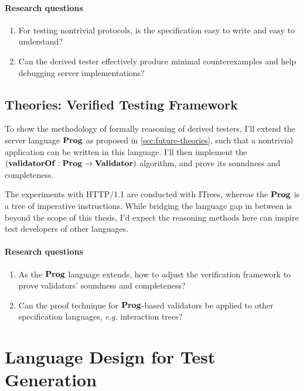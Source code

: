 \documentclass{article}
\newcommand{\http}{HTTP/1.1\xspace}
\theoremstyle{definition}
\newcommand{\Validator}{\ottkw{Validator}}
\newcommand{\Prog}{\ottkw{Prog}}
\newcommand{\validatorOf}{\ottkw{validatorOf}}
\begin{document}
\paragraph{Research questions}
\begin{enumerate}
\item For testing nontrivial protocols, is the specification easy to write and
  easy to understand?
\item Can the derived tester effectively produce minimal counterexamples and
  help debugging server implementations?
\end{enumerate}

\subsection{Theories: Verified Testing Framework}
To show the methodology of formally reasoning of derived testers, I'll extend
the server language $\Prog$ as proposed in \autoref{sec:future-theories}, such
that a nontrivial application can be written in this language.  I'll then
implement the $(\validatorOf:\Prog\to\Validator)$ algorithm, and prove its
soundness and completeness.

The experiments with \http are conducted with ITrees, whereas the $\Prog$ is a
tree of imperative instructions.  While bridging the language gap in between is
beyond the scope of this thesis, I'd expect the reasoning methods here can
inspire test developers of other languages.

\paragraph{Research questions}
\begin{enumerate}
\item As the $\Prog$ language extends, how to adjust the verification framework
  to prove validators' soundness and completeness?
\item Can the proof technique for $\Prog$-based validators be applied to other
  specification languages, {\it e.g.} interaction trees?
\end{enumerate}

\printbibliography
\pagebreak

\appendix
\section{Language Design for Test Generation}
\label{sec:appendix-ir}
\end{document}
